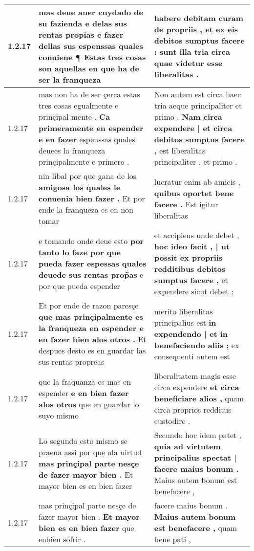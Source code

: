 \begin{tabular}{|p{1cm}|p{6.5cm}|p{6.5cm}|}
1.2.17 & mas deue auer cuydado de su fazienda \textbf{ e delas sus rentas propias e fazer dellas sus espenssas quales conuiene ¶ } Estas tres cosas son aquellas en que ha de ser la franqueza & habere debitam curam de propriis , \textbf{ et ex eis debitos sumptus facere : } sunt illa tria circa quae videtur esse liberalitas . \\\hline
1.2.17 & mas non ha de ser çerca estas tres cosas egualmente e prinçipal mente . \textbf{ Ca primeramente en espender e en fazer } espenssas quales deuees la franqueza prinçipalmente e primero . & Non autem est circa haec tria aeque principaliter et primo . \textbf{ Nam circa expendere | et circa debitos sumptus facere , } est liberalitas principaliter , et primo . \\\hline
1.2.17 & nin libal por que gana de los \textbf{ amigosa los quales le conuenia bien fazer . } Et por ende la franqueza es en non tomar & lucratur enim ab amicis , \textbf{ quibus oportet bene facere . } Est igitur liberalitas \\\hline
1.2.17 & e tomando onde deue esto \textbf{ por tanto lo faze por que pueda fazer espessas quales deuede sus rentas prop̃as } e por que pueda espender & et accipiens unde debet , \textbf{ hoc ideo facit , | ut possit ex propriis redditibus debitos sumptus facere , } et expendere sicut debet : \\\hline
1.2.17 & Et por ende de razon paresçe \textbf{ que mas prinçipalmente es la franqueza en espender e en fazer bien alos otros . } Et despues desto es en guardar las sus rentas propreas & merito liberalitas principalius est \textbf{ in expendendo | et in benefaciendo aliis ; } ex consequenti autem est \\\hline
1.2.17 & que la fraquanza es mas en espender \textbf{ e en bien fazer alos otros } que en guardar lo suyo mismo & liberalitatem magis esse circa expendere \textbf{ et circa beneficiare alios , } quam circa proprios redditus custodire . \\\hline
1.2.17 & Lo segundo esto mismo se praeua assi por que ala uirtud \textbf{ mas prinçipal parte nesçe de fazer mayor bien . } Et mayor bien es en bien fazer & Secundo hoc idem patet , \textbf{ quia ad virtutem principalius spectat | facere maius bonum . } Maius autem bonum est benefacere , \\\hline
1.2.17 & mas prinçipal parte nesçe de fazer mayor bien . \textbf{ Et mayor bien es en bien fazer } que enbien sofrir . & facere maius bonum . \textbf{ Maius autem bonum est benefacere , } quam bene pati , \\\hline

\end{tabular}
